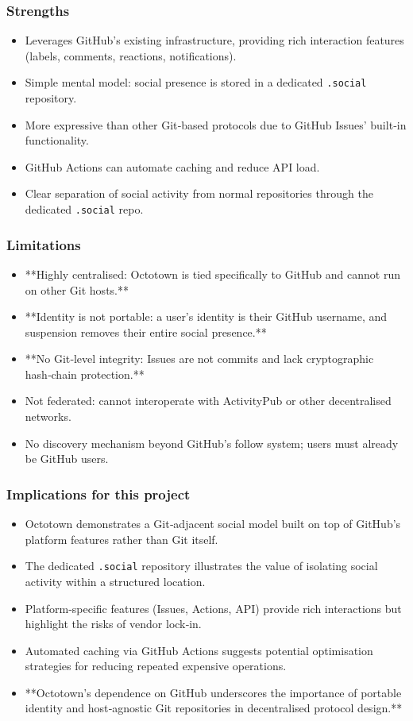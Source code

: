 \subsubsection*{Strengths}
\begin{itemize}
    \item Leverages GitHub’s existing infrastructure, providing rich interaction features (labels, comments, reactions, notifications).
    \item Simple mental model: social presence is stored in a dedicated \texttt{.social} repository.
    \item More expressive than other Git‑based protocols due to GitHub Issues’ built‑in functionality.
    \item GitHub Actions can automate caching and reduce API load.
    \item Clear separation of social activity from normal repositories through the dedicated \texttt{.social} repo.
\end{itemize}

\subsubsection*{Limitations}
\begin{itemize}
    \item **Highly centralised: Octotown is tied specifically to GitHub and cannot run on other Git hosts.**
    \item **Identity is not portable: a user’s identity is their GitHub username, and suspension removes their entire social presence.**
    \item **No Git‑level integrity: Issues are not commits and lack cryptographic hash‑chain protection.**
    \item Not federated: cannot interoperate with ActivityPub or other decentralised networks.
    \item No discovery mechanism beyond GitHub’s follow system; users must already be GitHub users.
\end{itemize}

\subsubsection*{Implications for this project}
\begin{itemize}
    \item Octotown demonstrates a Git‑adjacent social model built on top of GitHub’s platform features rather than Git itself.
    \item The dedicated \texttt{.social} repository illustrates the value of isolating social activity within a structured location.
    \item Platform‑specific features (Issues, Actions, API) provide rich interactions but highlight the risks of vendor lock‑in.
    \item Automated caching via GitHub Actions suggests potential optimisation strategies for reducing repeated expensive operations.
    \item **Octotown’s dependence on GitHub underscores the importance of portable identity and host‑agnostic Git repositories in decentralised protocol design.**
\end{itemize}


